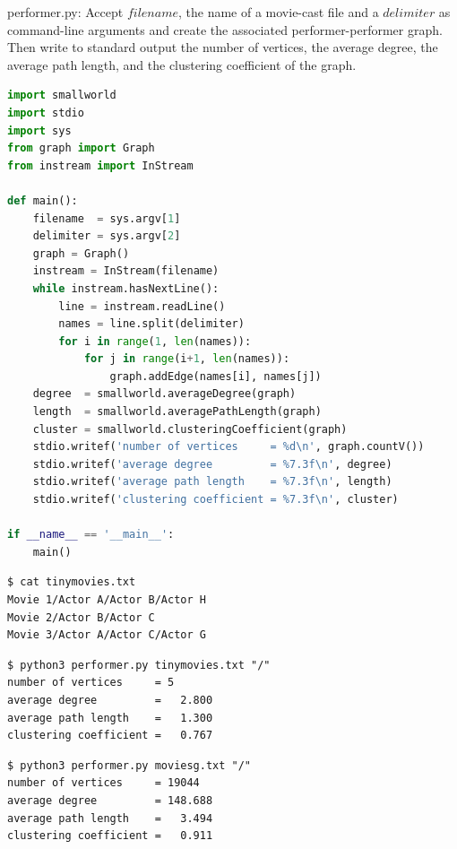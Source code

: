 \documentclass[8pt,a4paper,compress]{beamer}
\begin{document}
\begin{frame}[fragile]
\pause

\begin{framed}
\tiny performer.py: Accept $filename$, the name of a movie-cast file and a $delimiter$ as command-line arguments and create the associated performer-performer graph. Then write to standard output the number of vertices, the average degree, the average path length, and the clustering coefficient of the graph.
\end{framed}

\begin{lstlisting}[language=python,style=focusin]
import smallworld
import stdio
import sys
from graph import Graph
from instream import InStream

def main():
    filename  = sys.argv[1]
    delimiter = sys.argv[2]
    graph = Graph()
    instream = InStream(filename)
    while instream.hasNextLine():
        line = instream.readLine()
        names = line.split(delimiter)
        for i in range(1, len(names)):
            for j in range(i+1, len(names)):
                graph.addEdge(names[i], names[j])
    degree  = smallworld.averageDegree(graph)
    length  = smallworld.averagePathLength(graph)
    cluster = smallworld.clusteringCoefficient(graph)
    stdio.writef('number of vertices     = %d\n', graph.countV())
    stdio.writef('average degree         = %7.3f\n', degree)
    stdio.writef('average path length    = %7.3f\n', length)
    stdio.writef('clustering coefficient = %7.3f\n', cluster)

if __name__ == '__main__':
    main()
\end{lstlisting}
\end{frame}

\begin{frame}[fragile]
\pause

\begin{lstlisting}[language={},style=focusin]
$ cat tinymovies.txt
Movie 1/Actor A/Actor B/Actor H
Movie 2/Actor B/Actor C
Movie 3/Actor A/Actor C/Actor G
\end{lstlisting}

\pause

\begin{lstlisting}[language={},style=focusin]
$ python3 performer.py tinymovies.txt "/"
number of vertices     = 5
average degree         =   2.800
average path length    =   1.300
clustering coefficient =   0.767
\end{lstlisting}

\pause

\begin{lstlisting}[language={},style=focusin]
$ python3 performer.py moviesg.txt "/"
number of vertices     = 19044
average degree         = 148.688
average path length    =   3.494
clustering coefficient =   0.911
\end{lstlisting}
\end{frame}
\end{document}
